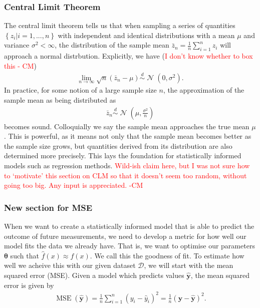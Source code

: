 \documentclass[twocolumn,english,notitlepage]{article}
\newcommand{\comment}[1]{\textcolor{red}{#1}}
\renewcommand{\vec}[1]{\boldsymbol{#1}}
\newcommand{\pclosed}[1]{\left(#1\right)}
\newcommand{\cclosed}[1]{\left\{#1\right\}}
\newcommand{\normal}[2]{\operatorname{\mathcal{N}}\pclosed{#1,#2}}
\newcommand{\distas}{\overset{d}{\sim}}
\DeclareMathOperator{\mse}{\operatorname{MSE}}
\begin{document}
    \subsubsection{Central Limit Theorem}
        The central limit theorem tells us that when sampling a series of quantities $\cclosed{z_i|i=1,...,n}$ with independent and identical distributions with a mean $\mu$ and variance $\sigma^2<\infty$, the distribution of the sample mean $\bar{z}_n = \frac{1}{n}\sum_{i=1}^n z_i$ will approach a normal distrbution. Explicitly, we have (\comment{I don't know whether to box this - CM})
        \begin{align}
            \boxed{
                \lim_{n\to\infty} \sqrt{n}(\bar{z}_n-\mu) \distas \normal{0}{\sigma^2}.
            }
        \end{align}
        In practice, for some notion of a large sample size $n$, the approximation of the sample mean as being distributed as
        \begin{align}
            \bar{z}_n \distas \normal{\mu}{\frac{\sigma^2}{n}}
        \end{align}
        becomes sound. Colloquially we say the sample mean approaches the true mean $\mu$. This is powerful, as it means not only that the sample mean becomes better as the sample size grows, but quantities derived from its distribution are also determined more precisely. This lays the foundation for statistically informed models such as regression methods. \comment{Wild-ish claim here, but I was not sure how to `motivate' this section on CLM so that it doesn't seem too random, without going too big. Any input is appreciated. -CM}




    \subsubsection{New section for MSE}
        When we want to create a statistically informed model that is able to predict the outcome of future measurements, we need to develop a metric for how well our model fits the data we already have. That is, we want to optimise our parameters $\vec{\theta}$ such that $\hat{f}(x) \approx f(x)$. We call this the goodness of fit. To estimate how well we acheive this with our given dataset $\mathcal{D}$, we will start with the mean squared error (MSE). Given a model which predicts values $\vec{\hat{y}}$, the mean squared error is given by
        \begin{align}
            \boxed{
                \mse(\vec{\hat{y}}) = \frac{1}{n} \sum_{i=1}^n (y_i-\hat{y}_i)^2 = \frac{1}{n} (\vec{y} - \vec{\hat{y}})^2.
            }
        \end{align}
\end{document}
